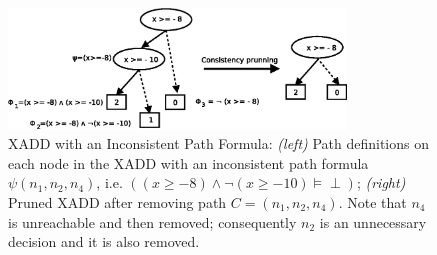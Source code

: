 \documentclass[twoside,11pt]{article}
\begin{document}
%
\begin{figure}[t!]
\centering
\includegraphics[width=0.8\textwidth]{FiguresSource/consistencyPrunning.eps}
%
%
\vspace{-2mm}
\caption{%
XADD with an Inconsistent Path Formula:  {\it (left)} Path definitions on each node in the XADD with an inconsistent path formula $\psi(n_1, n_2, n_4)$, i.e. $((x \geq -8) \wedge \neg (x \geq -10) \models\perp)$; {\it (right)} Pruned XADD after removing path $C=(n_1, n_2, n_4)$. Note that $n_4$ is unreachable and then removed; consequently $n_2$ is an unnecessary decision and it is also removed. 
}
\label{fig:consistent_graph}
\end{figure}
\end{document}
